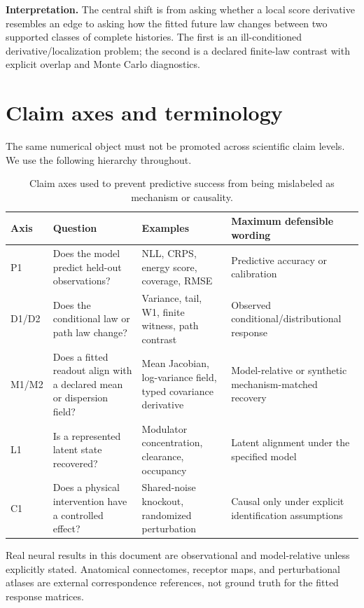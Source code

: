 \documentclass[10pt]{article}
\newcommand{\claim}[1]{\par\noindent\colorbox{pale}{\parbox{0.965\linewidth}{\textbf{Interpretation.} #1}}\par}
\begin{document}
\claim{The central shift is from asking whether a local score derivative resembles an edge to asking how the fitted future law changes between two supported classes of complete histories. The first is an ill-conditioned derivative/localization problem; the second is a declared finite-law contrast with explicit overlap and Monte Carlo diagnostics.}

\section{Claim axes and terminology}

The same numerical object must not be promoted across scientific claim levels. We use the following hierarchy throughout.

\begin{table}[H]
\centering\small
\begin{tabularx}{\linewidth}{L{1.15cm}L{3.15cm}Y Y}
\toprule
Axis & Question & Examples & Maximum defensible wording \\
\midrule
P1 & Does the model predict held-out observations? & NLL, CRPS, energy score, coverage, RMSE & Predictive accuracy or calibration \\
D1/D2 & Does the conditional law or path law change? & Variance, tail, W1, finite witness, path contrast & Observed conditional/distributional response \\
M1/M2 & Does a fitted readout align with a declared mean or dispersion field? & Mean Jacobian, log-variance field, typed covariance derivative & Model-relative or synthetic mechanism-matched recovery \\
L1 & Is a represented latent state recovered? & Modulator concentration, clearance, occupancy & Latent alignment under the specified model \\
C1 & Does a physical intervention have a controlled effect? & Shared-noise knockout, randomized perturbation & Causal only under explicit identification assumptions \\
\bottomrule
\end{tabularx}
\caption{Claim axes used to prevent predictive success from being mislabeled as mechanism or causality.}
\end{table}

Real neural results in this document are observational and model-relative unless explicitly stated. Anatomical connectomes, receptor maps, and perturbational atlases are external correspondence references, not ground truth for the fitted response matrices.
\end{document}
